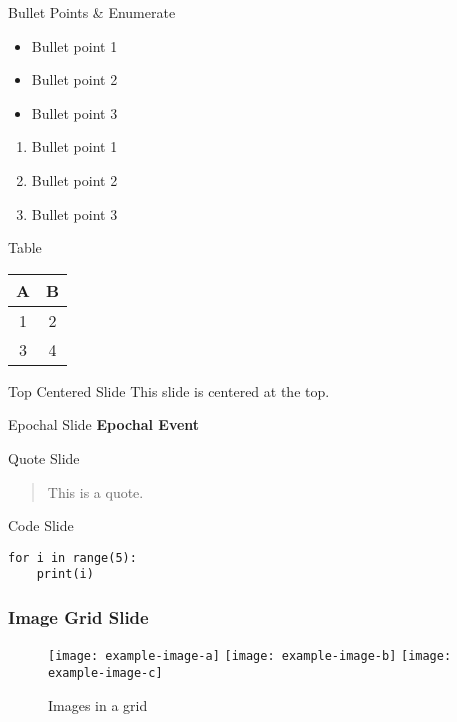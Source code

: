 \begin{frame}{Bullet Points \& Enumerate}
\begin{itemize}
\item Bullet point 1
\item Bullet point 2
\item Bullet point 3
\end{itemize}
\begin{enumerate}
\item Bullet point 1
\item Bullet point 2
\item Bullet point 3
\end{enumerate}
\end{frame}

\begin{frame}{Table}
\begin{tabular}{|c|c|}
\hline
A & B \\
\hline
1 & 2 \\
3 & 4 \\
\hline
\end{tabular}
\end{frame}

\begin{frame}[t]{Top Centered Slide}
This slide is centered at the top.
\end{frame}

\begin{frame}{Epochal Slide}
\centering
\textbf{\Huge Epochal Event}
\end{frame}

\begin{frame}{Quote Slide}
\begin{quote}
This is a quote.
\end{quote}
\end{frame}

\begin{frame}[fragile]{Code Slide}
\begin{verbatim}
for i in range(5):
    print(i)
\end{verbatim}
\end{frame}

\begin{frame}
\frametitle{Image Grid Slide}
\begin{figure}
\texttt{[image: example-image-a]}
\texttt{[image: example-image-b]}
\texttt{[image: example-image-c]}
\caption{Images in a grid}
\end{figure}
\end{frame}

